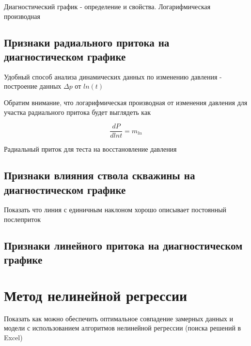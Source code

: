 Диагностический график - определение и свойства. Логарифмическая производная 

\subsection{Признаки радиального притока на диагностическом графике}
Удобный способ анализа динамических данных  по изменению давления - построение данных $\Delta p$ от $ln(t)$


Обратим внимание, что логарифмическая производная от изменения давления для участка радиального притока будет выглядеть как 

$$ \frac{dP}{d ln{t}} = m_{ln} $$

Радиальный приток для теста на восстановление давления

\subsection{Признаки влияния ствола скважины на диагностическом графике}

Показать что линия с единичным наклоном хорошо описывает постоянный послеприток

\subsection{Признаки линейного притока на диагностическом графике}

\section{Метод нелинейной регрессии}

Показать как можно обеспечить оптимальное совпадение замерных данных и модели с использованием алгоритмов нелинейной регрессии (поиска решений в Excel)